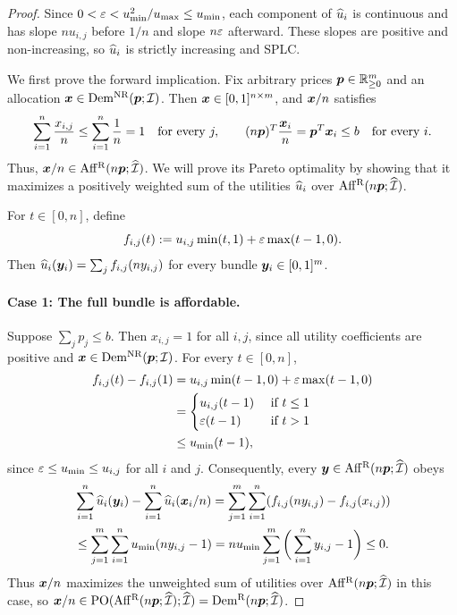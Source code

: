 \begin{proof}
Since $0 < \varepsilon < u_{\min}^2/u_{\max} \le u_{\min}$, each component of $\widehat{u}_i$
is continuous and has slope $nu_{i,j}$ before $1/n$ and slope $n\varepsilon$ afterward.
These slopes are positive and non-increasing, so $\widehat{u}_i$ is strictly increasing and SPLC.

We first prove the forward implication. Fix arbitrary prices $\bm{p} \in \mathbb{R}_{\ge 0}^m$
and an allocation $\bm{x} \in \operatorname{Dem^{\mathrm{NR}}}(\bm{p}; \mathcal{I})$.
Then $\bm{x} \in [0,1]^{n \times m}$, and $\bm{x}/n$ satisfies
\[ \sum_{i=1}^n \frac{x_{i,j}}{n} \le \sum_{i=1}^n \frac{1}{n} = 1 \quad\text{for every }j,
    \qquad (n\bm{p})^T\frac{\bm{x}_i}{n} = \bm{p}^T\bm{x}_i \le b \quad\text{for every }i. \]
Thus, $\bm{x}/n \in \operatorname{Aff^{\mathrm{R}}}(n\bm{p}; \widehat{\mathcal{I}})$.
We will prove its Pareto optimality by showing that it maximizes a positively weighted sum
of the utilities $\widehat{u}_i$ over $\operatorname{Aff^{\mathrm{R}}}(n\bm{p}; \widehat{\mathcal{I}})$.

For $t \in [0,n]$, define
\[ f_{i,j}(t) := u_{i,j}\min(t,1) + \varepsilon\max(t-1,0). \]
Then $\widehat{u}_i(\bm{y}_i)=\sum_j f_{i,j}(ny_{i,j})$ for every bundle $\bm{y}_i \in [0,1]^m$.

\paragraph{Case 1: The full bundle is affordable.}
Suppose $\sum_j p_j \le b$. Then $x_{i,j} = 1$ for all $i,j$,
since all utility coefficients are positive and $\bm{x} \in \operatorname{Dem^{\mathrm{NR}}}(\bm{p}; \mathcal{I})$.
For every $t \in [0,n]$,
\begin{align*}
f_{i,j}(t) - f_{i,j}(1)
&= u_{i,j}\min(t-1, 0) + \varepsilon\max(t-1, 0)
\\ &= \begin{cases}u_{i,j}(t-1) & \text{ if } t \le 1 \\ \varepsilon(t-1) & \text{ if } t > 1\end{cases}
\\ &\le u_{\min}(t-1),
\end{align*}
since $\varepsilon \le u_{\min} \le u_{i,j}$ for all $i$ and $j$.
Consequently, every $\bm{y} \in \operatorname{Aff^{\mathrm{R}}}(n\bm{p}; \widehat{\mathcal{I}})$ obeys
\begin{align*}
& \sum_{i=1}^n \widehat{u}_i(\bm{y}_i) - \sum_{i=1}^n \widehat{u}_i(\bm{x}_i/n)
= \sum_{j=1}^m \sum_{i=1}^n (f_{i,j}(ny_{i,j}) - f_{i,j}(x_{i,j}))
\\ &\le \sum_{j=1}^m \sum_{i=1}^n u_{\min}(ny_{i,j} - 1)
= nu_{\min} \sum_{j=1}^m \bigg(\sum_{i=1}^n y_{i,j} - 1\bigg)
\le 0.
\end{align*}
Thus $\bm{x}/n$ maximizes the unweighted sum of utilities over $\operatorname{Aff^{\mathrm{R}}}(n\bm{p};\widehat{\mathcal{I}})$ in this case,
so $\bm{x}/n \in \operatorname{PO}(\operatorname{Aff^{\mathrm{R}}}(n\bm{p}; \widehat{\mathcal{I}}); \widehat{\mathcal{I}}) = \operatorname{Dem^{\mathrm{R}}}(n\bm{p}; \widehat{\mathcal{I}})$.


\end{proof}
